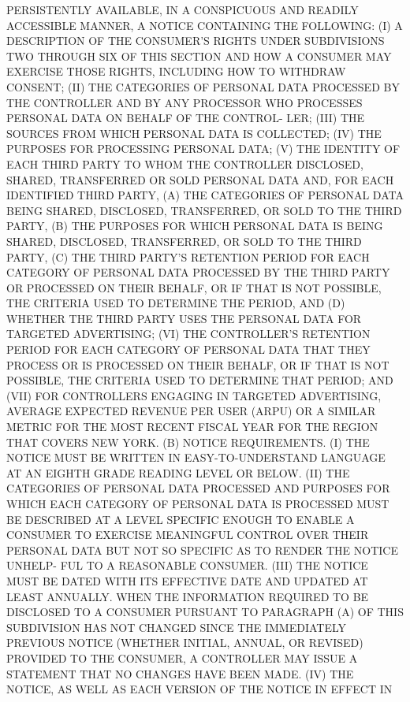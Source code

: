  PERSISTENTLY  AVAILABLE, IN A CONSPICUOUS AND READILY ACCESSIBLE MANNER,
 A NOTICE CONTAINING THE FOLLOWING:
   (I)  A  DESCRIPTION  OF  THE  CONSUMER'S RIGHTS UNDER SUBDIVISIONS TWO
 THROUGH SIX OF THIS SECTION  AND  HOW  A  CONSUMER  MAY  EXERCISE  THOSE
 RIGHTS, INCLUDING HOW TO WITHDRAW CONSENT;
   (II)  THE  CATEGORIES OF PERSONAL DATA PROCESSED BY THE CONTROLLER AND
 BY ANY PROCESSOR WHO PROCESSES PERSONAL DATA ON BEHALF OF  THE  CONTROL-
 LER;
   (III) THE SOURCES FROM WHICH PERSONAL DATA IS COLLECTED;
   (IV) THE PURPOSES FOR PROCESSING PERSONAL DATA;
   (V) THE IDENTITY OF EACH THIRD PARTY TO WHOM THE CONTROLLER DISCLOSED,
 SHARED, TRANSFERRED OR SOLD PERSONAL DATA AND, FOR EACH IDENTIFIED THIRD
 PARTY,  (A)  THE  CATEGORIES  OF  PERSONAL DATA BEING SHARED, DISCLOSED,
 TRANSFERRED, OR SOLD TO THE THIRD PARTY,  (B)  THE  PURPOSES  FOR  WHICH
 PERSONAL  DATA  IS  BEING SHARED, DISCLOSED, TRANSFERRED, OR SOLD TO THE
 THIRD PARTY, (C) THE THIRD PARTY'S RETENTION PERIOD FOR EACH CATEGORY OF
 PERSONAL DATA PROCESSED BY THE THIRD PARTY OR PROCESSED ON THEIR BEHALF,
 OR IF THAT IS NOT POSSIBLE, THE CRITERIA USED TO DETERMINE  THE  PERIOD,
 AND  (D)  WHETHER  THE  THIRD  PARTY USES THE PERSONAL DATA FOR TARGETED
 ADVERTISING;
   (VI) THE CONTROLLER'S RETENTION PERIOD FOR EACH CATEGORY  OF  PERSONAL
 DATA  THAT  THEY  PROCESS OR IS PROCESSED ON THEIR BEHALF, OR IF THAT IS
 NOT POSSIBLE, THE CRITERIA USED TO DETERMINE THAT PERIOD; AND
   (VII)  FOR  CONTROLLERS  ENGAGING  IN  TARGETED  ADVERTISING,  AVERAGE
 EXPECTED REVENUE PER USER (ARPU) OR A SIMILAR METRIC FOR THE MOST RECENT
 FISCAL YEAR FOR THE REGION THAT COVERS NEW YORK.
   (B) NOTICE REQUIREMENTS.
   (I)  THE  NOTICE  MUST BE WRITTEN IN EASY-TO-UNDERSTAND LANGUAGE AT AN
 EIGHTH GRADE READING LEVEL OR BELOW.
   (II) THE CATEGORIES OF PERSONAL DATA PROCESSED AND PURPOSES FOR  WHICH
 EACH CATEGORY OF PERSONAL DATA IS PROCESSED MUST BE DESCRIBED AT A LEVEL
 SPECIFIC ENOUGH TO ENABLE A CONSUMER TO EXERCISE MEANINGFUL CONTROL OVER
 THEIR  PERSONAL DATA BUT NOT SO SPECIFIC AS TO RENDER THE NOTICE UNHELP-
 FUL TO A REASONABLE CONSUMER.
   (III) THE NOTICE MUST BE DATED WITH ITS EFFECTIVE DATE AND UPDATED  AT
 LEAST  ANNUALLY.    WHEN  THE  INFORMATION REQUIRED TO BE DISCLOSED TO A
 CONSUMER PURSUANT TO PARAGRAPH (A) OF THIS SUBDIVISION HAS  NOT  CHANGED
 SINCE  THE  IMMEDIATELY  PREVIOUS  NOTICE  (WHETHER  INITIAL, ANNUAL, OR
 REVISED) PROVIDED TO THE CONSUMER, A CONTROLLER MAY  ISSUE  A  STATEMENT
 THAT NO CHANGES HAVE BEEN MADE.
   (IV)  THE  NOTICE,  AS WELL AS EACH VERSION OF THE NOTICE IN EFFECT IN
